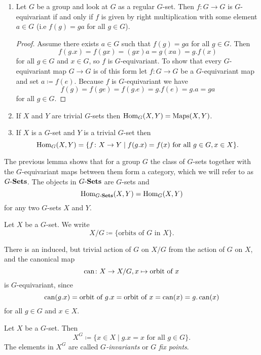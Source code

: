 \begin{expls}
 \begin{enumerate}[label=\emph{\alph*)},leftmargin=*]
  \item
   Let $G$ be a group and look at $G$ as a regular $G$-set. Then $f \colon G \to G$ is $G$-equivariant if and only if $f$ is given by right multiplication with some element $a \in G$ (i.e $f(g) = ga$ for all $g \in G$).
   \begin{proof}
    Assume there exists $a \in G$ such that $f(g) = ga$ for all $g \in G$. Then
    \[
     f(g.x) = f(gx) = (gx)a = g(xa) = g.f(x)
    \]
    for all $g \in G$ and $x \in G$, so $f$ is $G$-equivariant. To show that every $G$-equivariant map $G \to G$ is of this form let $f \colon G \to G$ be a $G$-equivariant map and set $a \coloneqq f(e)$. Because $f$ is $G$-equivariant we have
    \[
     f(g) = f(ge) = f(g.e) = g.f(e) = g.a = ga
    \]
    for all $g \in G$.
   \end{proof}
  \item
   If $X$ and $Y$ are trivial $G$-sets then $\operatorname{Hom}_G(X,Y) = \operatorname{Maps}(X,Y)$.
  \item
   If $X$ is a $G$-set and $Y$ is a trivial $G$-set then
   \[
    \operatorname{Hom}_G(X,Y) = \{f \colon X \to Y \mid f(g.x) = f(x) \text{ for all } g \in G, x \in X\}.
   \]
 \end{enumerate}
\end{expls}


The previous lemma shows that for a group $G$ the class of $G$-sets together with the $G$-equivariant maps between them form a category, which we will refer to as $G\text{-}\mathbf{Sets}$. The objects in $G\text{-}\mathbf{Sets}$ are $G$-sets and
\[
 \operatorname{Hom}_{G\text{-}\mathbf{Sets}}(X,Y) = \operatorname{Hom}_G(X,Y)
\]
for any two $G$-sets $X$ and $Y$.


\begin{defi}
 Let $X$ be a $G$-set. We write
 \[
  X/G \coloneqq \{\text{orbits of $G$ in $X$}\}.
 \]
\end{defi}


\begin{note}
 There is an induced, but trivial action of $G$ on $X/G$ from the action of $G$ on $X$, and the canonical map
 \[
  \operatorname{can} \colon X \to X/G, x \mapsto \text{orbit of } x
 \]
 is $G$-equivariant, since
 \[
  \operatorname{can}(g.x) = \text{orbit of $g.x$} = \text{orbit of $x$} = \operatorname{can}(x) = g.\operatorname{can}(x)
 \]
 for all $g \in G$ and $x \in X$.
\end{note}


\begin{defi}
 Let $X$ be a $G$-set. Then
 \[
  X^G \coloneqq \{x \in X \mid g.x = x \text{ for all } g \in G\}.
 \]
 The elements in $X^G$ are called \emph{$G$-invariants} or \emph{$G$ fix points}.
\end{defi}


